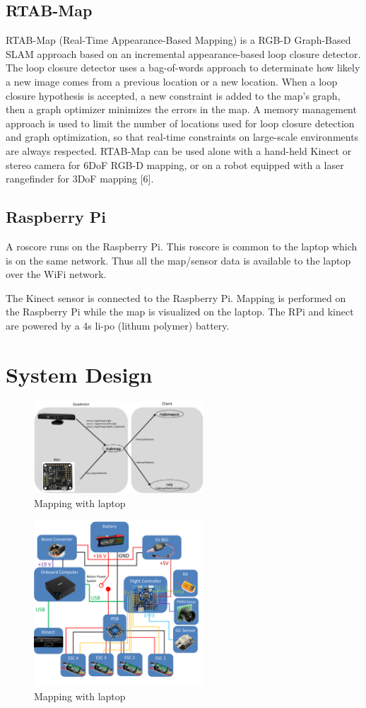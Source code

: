 \documentclass[journal]{IEEEtran}
\begin{document}
\subsection{RTAB-Map}
RTAB-Map (Real-Time Appearance-Based Mapping) is a RGB-D Graph-Based SLAM approach based on an incremental appearance-based loop closure detector. The loop closure detector uses a bag-of-words approach to determinate how likely a new image comes from a previous location or a new location. When a loop closure hypothesis is accepted, a new constraint is added to the map’s graph, then a graph optimizer minimizes the errors in the map. A memory management approach is used to limit the number of locations used for loop closure detection and graph optimization, so that real-time constraints on large-scale environments are always respected. RTAB-Map can be used alone with a hand-held Kinect or stereo camera for 6DoF RGB-D mapping, or on a robot equipped with a laser rangefinder for 3DoF mapping [6].

\subsection{Raspberry Pi}
A roscore runs on the Raspberry Pi. This roscore is common to the laptop which is on the same network. Thus all the map/sensor data is available to the laptop over the WiFi network.

The Kinect sensor is connected to the Raspberry Pi. Mapping is performed on the Raspberry Pi while the map is visualized on the laptop. 
The RPi and kinect are powered by a 4s li-po (lithum polymer) battery. 

\section{System Design}
\begin{figure}[ht]
	\centering
	\includegraphics[width=2.5in]{setupC.png}
	\caption{Mapping with laptop}
	\label{fig_sim}
\end{figure}

\begin{figure}[ht]
	\centering
	\includegraphics[width=2.5in]{Wiring_Diagram.png}
	\caption{Mapping with laptop}
	\label{fig_sim}
\end{figure}
\end{document}
